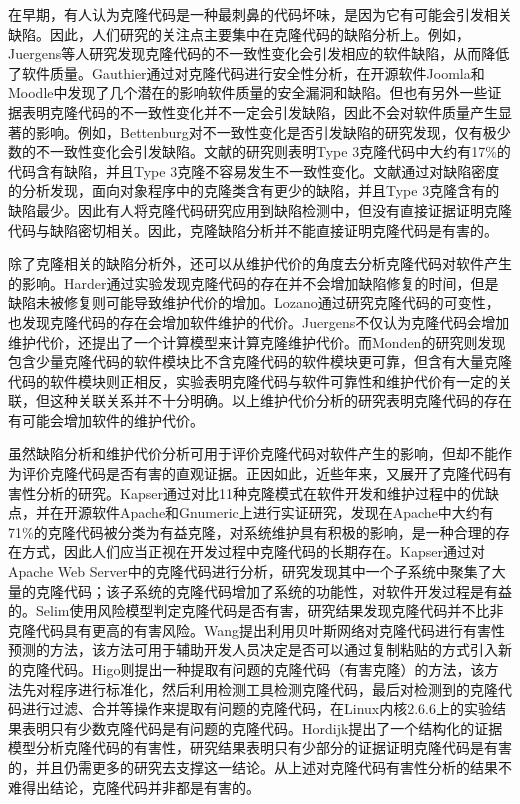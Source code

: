 在早期，有人认为克隆代码是一种最刺鼻的代码坏味，是因为它有可能会引发相关缺陷。因此，人们研究的关注点主要集中在克隆代码的缺陷分析上。例如，Juergens等人研究发现克隆代码的不一致性变化会引发相应的软件缺陷，从而降低了软件质量\cite{juergens2009code}。Gauthier通过对克隆代码进行安全性分析，在开源软件Joomla和Moodle中发现了几个潜在的影响软件质量的安全漏洞和缺陷\cite{gauthier2013uncovering}。但也有另外一些证据表明克隆代码的不一致性变化并不一定会引发缺陷，因此不会对软件质量产生显著的影响。例如，Bettenburg对不一致性变化是否引发缺陷的研究发现，仅有极少数的不一致性变化会引发缺陷\cite{bettenburg2009empirical}。文献\cite{wagner2016relationship}的研究则表明Type 3克隆代码中大约有17\%的代码含有缺陷，并且Type 3克隆不容易发生不一致性变化。文献\cite{elish2015fault}通过对缺陷密度的分析发现，面向对象程序中的克隆类含有更少的缺陷，并且Type 3克隆含有的缺陷最少。因此有人将克隆代码研究应用到缺陷检测中，但没有直接证据证明克隆代码与缺陷密切相关\cite{lo2012active}\cite{kamei2011empirical}。因此，克隆缺陷分析并不能直接证明克隆代码是有害的。

除了克隆相关的缺陷分析外，还可以从维护代价的角度去分析克隆代码对软件产生的影响。Harder通过实验发现克隆代码的存在并不会增加缺陷修复的时间，但是缺陷未被修复则可能导致维护代价的增加\cite{harder2012controlled}。Lozano通过研究克隆代码的可变性，也发现克隆代码的存在会增加软件维护的代价\cite{lozano2008assessing}。Juergens不仅认为克隆代码会增加维护代价，还提出了一个计算模型来计算克隆维护代价\cite{juergens2010much}。而Monden的研究则发现包含少量克隆代码的软件模块比不含克隆代码的软件模块更可靠，但含有大量克隆代码的软件模块则正相反，实验表明克隆代码与软件可靠性和维护代价有一定的关联，但这种关联关系并不十分明确\cite{monden2002software}。以上维护代价分析的研究表明克隆代码的存在有可能会增加软件的维护代价。

虽然缺陷分析和维护代价分析可用于评价克隆代码对软件产生的影响，但却不能作为评价克隆代码是否有害的直观证据。正因如此，近些年来，又展开了克隆代码有害性分析的研究。Kapser通过对比11种克隆模式在软件开发和维护过程中的优缺点，并在开源软件Apache和Gnumeric上进行实证研究，发现在Apache中大约有71\%的克隆代码被分类为有益克隆，对系统维护具有积极的影响，是一种合理的存在方式，因此人们应当正视在开发过程中克隆代码的长期存在\cite{kapser2006cloning}\cite{kapser2008cloning}。Kapser通过对Apache Web Server中的克隆代码进行分析，研究发现其中一个子系统中聚集了大量的克隆代码；该子系统的克隆代码增加了系统的功能性，对软件开发过程是有益的\cite{kapser2006supporting}。Selim使用风险模型判定克隆代码是否有害，研究结果发现克隆代码并不比非克隆代码具有更高的有害风险\cite{selim2010studying}。Wang提出利用贝叶斯网络对克隆代码进行有害性预测的方法\cite{wang2012can}，该方法可用于辅助开发人员决定是否可以通过复制粘贴的方式引入新的克隆代码。Higo则提出一种提取有问题的克隆代码（有害克隆）的方法，该方法先对程序进行标准化，然后利用检测工具检测克隆代码，最后对检测到的克隆代码进行过滤、合并等操作来提取有问题的克隆代码，在Linux内核2.6.6上的实验结果表明只有少数克隆代码是有问题的克隆代码\cite{higo2009problematic}。Hordijk提出了一个结构化的证据模型分析克隆代码的有害性，研究结果表明只有少部分的证据证明克隆代码是有害的，并且仍需更多的研究去支撑这一结论\cite{hordijk2009harmfulness}。从上述对克隆代码有害性分析的结果不难得出结论，克隆代码并非都是有害的。

